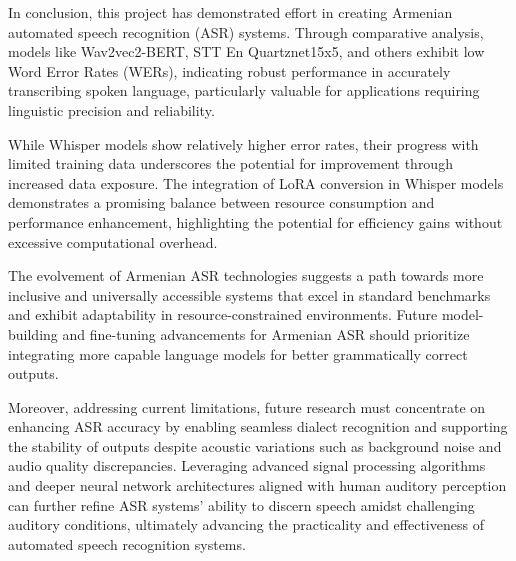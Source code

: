 \documentclass[conference]{IEEEtran}
\begin{document}
In conclusion, this project has demonstrated effort in creating Armenian automated speech recognition (ASR) systems. Through comparative analysis, models like Wav2vec2-BERT, STT En Quartznet15x5, and others exhibit low Word Error Rates (WERs), indicating robust performance in accurately transcribing spoken language, particularly valuable for applications requiring linguistic precision and reliability.

While Whisper models show relatively higher error rates, their progress with limited training data underscores the potential for improvement through increased data exposure. The integration of LoRA conversion in Whisper models demonstrates a promising balance between resource consumption and performance enhancement, highlighting the potential for efficiency gains without excessive computational overhead.

The evolvement of Armenian ASR technologies suggests a path towards more inclusive and universally accessible systems that excel in standard benchmarks and exhibit adaptability in resource-constrained environments. Future model-building and fine-tuning advancements for Armenian ASR should prioritize integrating more capable language models for better grammatically correct outputs. 

Moreover, addressing current limitations, future research must concentrate on enhancing ASR accuracy by enabling seamless dialect recognition and supporting the stability of outputs despite acoustic variations such as background noise and audio quality discrepancies. Leveraging advanced signal processing algorithms and deeper neural network architectures aligned with human auditory perception can further refine ASR systems' ability to discern speech amidst challenging auditory conditions, ultimately advancing the practicality and effectiveness of automated speech recognition systems.

\newpage

  

\end{document}
